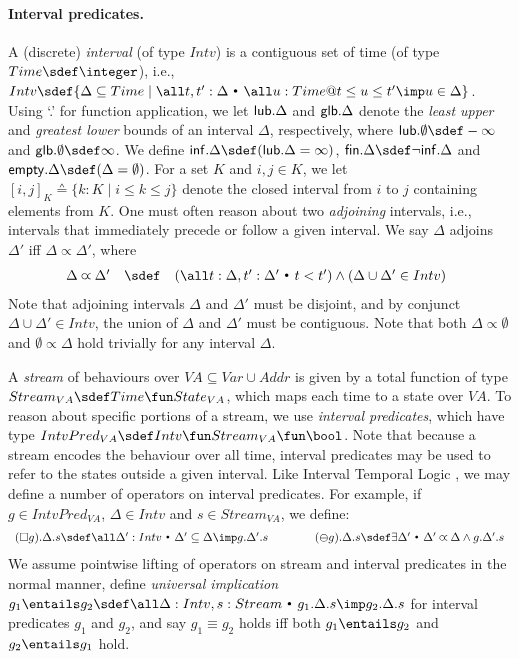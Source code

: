\documentclass{article}
\newcommand{\Fin}{{\sf fin}}
\newcommand{\Inf}{{\sf inf}}
\newcommand{\lub}{{\sf lub}}
\newcommand{\glb}{{\sf glb}}
\newcommand{\st}{~{\scriptscriptstyle ^\bullet}~}
\theoremstyle{plain}
\theoremstyle{definition}
\newcommand{\prev}{\varominus}
\newcommand{\Empty}{{\sf empty}}
\def\adjoins{\mathbin{\varpropto}}
\begin{document}
\paragraph{Interval predicates.}
\label{sec:interval-predicates}
A (discrete) {\em interval} (of type $Intv$) is a contiguous set of
time (of type $Time \sdef \integer$), i.e., $Intv \sdef \{\Delta
\subseteq Time \mid \all t, t' : \Delta \st \all u : Time @ t \leq u
\leq t' \imp u \in \Delta\}$.  Using `.' for function application, we
let $\lub.\Delta$ and $\glb.\Delta$ denote the \emph{least upper} and
\emph{greatest lower} bounds of an interval $\Delta$, respectively,
where $\lub.\emptyset \sdef -\infty$ and $\glb.\emptyset \sdef
\infty$. We define $\Inf.\Delta \sdef (\lub.\Delta = \infty)$, $\Fin.\Delta
\sdef \neg \Inf.\Delta$ and $\Empty.\Delta \sdef (\Delta =
\emptyset)$.  For a set $K$ and $i, j \in K$, we let $[i,j]_K \sdef
\{k : K \mid i \leq k \leq j\}$ denote the closed interval from $i$ to
$j$ containing elements from $K$.  One must often reason about two
\emph{adjoining} intervals, i.e., intervals that immediately precede
or follow a given interval. We say $\Delta$ adjoins $\Delta'$ iff
$\Delta \adjoins \Delta'$, where 
$$\begin{array}[t]{rcl}
  \Delta \adjoins \Delta' & \sdef &
\begin{array}[t]{@{}l}
      (\all t : \Delta, t' : \Delta' \st t < t') \land (\Delta \cup \Delta' \in Intv)
  \end{array}
\end{array}$$
\noindent
Note that adjoining intervals $\Delta$ and $\Delta'$ must be disjoint,
and by conjunct $\Delta \cup \Delta' \in Intv$, the union of $\Delta$
and $\Delta'$ must be contiguous. Note that both $\Delta \adjoins
\emptyset$ and $\emptyset \adjoins \Delta$ hold trivially for any
interval $\Delta$.


A \emph{stream} of behaviours over $VA \subseteq Var \cup Addr$ is
given by a total function of type $Stream_{VA} \sdef Time \fun
State_{VA}$, which maps each time to a state over $VA$. To reason
about specific portions of a stream, we use \emph{interval
  predicates}, which have type $IntvPred_{VA} \sdef Intv \fun
Stream_{VA} \fun \bool$. Note that because a stream encodes the
behaviour over all time, interval predicates may be used to refer to
the states outside a given interval.
Like Interval Temporal Logic
\cite{Mos00}, we may define a number of operators on interval
predicates. For example, if $g \in IntvPred_{VA}$,
$\Delta\in Intv$ and $s \in Stream_{VA}$, we define:
$$
\begin{array}[t]{r@{\qquad\qquad}l}
  (\Box
  g).\Delta.s  \sdef   \all \Delta' : Intv \st \Delta' \subseteq \Delta \imp
  g.\Delta'.s
  &
  (\prev g).\Delta.s  \sdef  \exists
  \Delta' \st \Delta' \adjoins \Delta \land g.\Delta'.s
\end{array}
$$
\noindent
We assume pointwise lifting of operators on stream and interval
predicates in the normal manner, define \emph{universal implication} $
g_1 \entails g_2 \sdef \all \Delta : Intv, s : Stream \st g_1.\Delta.s
\imp g_2.\Delta.s $ for interval predicates $g_1$ and $g_2$, and say
$g_1\equiv g_2$ holds iff both $g_1 \entails g_2$ and $g_2 \entails
g_1$ hold.
\end{document}

